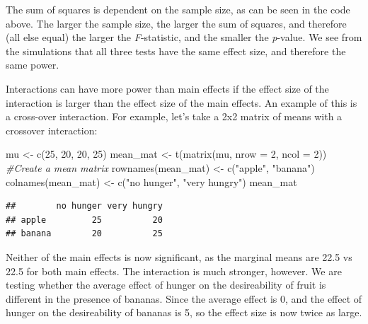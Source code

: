 \documentclass[
]{book}
\newenvironment{Shaded}{\begin{snugshade}}{\end{snugshade}}
\newcommand{\AttributeTok}[1]{\textcolor[rgb]{0.77,0.63,0.00}{#1}}
\newcommand{\CommentTok}[1]{\textcolor[rgb]{0.56,0.35,0.01}{\textit{#1}}}
\newcommand{\DecValTok}[1]{\textcolor[rgb]{0.00,0.00,0.81}{#1}}
\newcommand{\FunctionTok}[1]{\textcolor[rgb]{0.00,0.00,0.00}{#1}}
\newcommand{\NormalTok}[1]{#1}
\newcommand{\OtherTok}[1]{\textcolor[rgb]{0.56,0.35,0.01}{#1}}
\newcommand{\StringTok}[1]{\textcolor[rgb]{0.31,0.60,0.02}{#1}}
\begin{document}
The sum of squares is dependent on the sample size, as can be seen in the code above. The larger the sample size, the larger the sum of squares, and therefore (all else equal) the larger the \emph{F}-statistic, and the smaller the \emph{p}-value. We see from the simulations that all three tests have the same effect size, and therefore the same power.

Interactions can have more power than main effects if the effect size of the interaction is larger than the effect size of the main effects. An example of this is a cross-over interaction. For example, let's take a 2x2 matrix of means with a crossover interaction:

\begin{Shaded}
\begin{Highlighting}[]
\NormalTok{mu }\OtherTok{\textless{}{-}} \FunctionTok{c}\NormalTok{(}\DecValTok{25}\NormalTok{, }\DecValTok{20}\NormalTok{, }\DecValTok{20}\NormalTok{, }\DecValTok{25}\NormalTok{)}
\NormalTok{mean\_mat }\OtherTok{\textless{}{-}} \FunctionTok{t}\NormalTok{(}\FunctionTok{matrix}\NormalTok{(mu, }
                     \AttributeTok{nrow =} \DecValTok{2}\NormalTok{,}
                     \AttributeTok{ncol =} \DecValTok{2}\NormalTok{)) }\CommentTok{\#Create a mean matrix}
\FunctionTok{rownames}\NormalTok{(mean\_mat) }\OtherTok{\textless{}{-}} \FunctionTok{c}\NormalTok{(}\StringTok{"apple"}\NormalTok{, }\StringTok{"banana"}\NormalTok{)}
\FunctionTok{colnames}\NormalTok{(mean\_mat) }\OtherTok{\textless{}{-}} \FunctionTok{c}\NormalTok{(}\StringTok{"no hunger"}\NormalTok{, }\StringTok{"very hungry"}\NormalTok{)}
\NormalTok{mean\_mat}
\end{Highlighting}
\end{Shaded}

\begin{verbatim}
##        no hunger very hungry
## apple         25          20
## banana        20          25
\end{verbatim}

Neither of the main effects is now significant, as the marginal means are 22.5 vs 22.5 for both main effects. The interaction is much stronger, however. We are testing whether the average effect of hunger on the desireability of fruit is different in the presence of bananas. Since the average effect is 0, and the effect of hunger on the desireability of bananas is 5, so the effect size is now twice as large.
\end{document}

